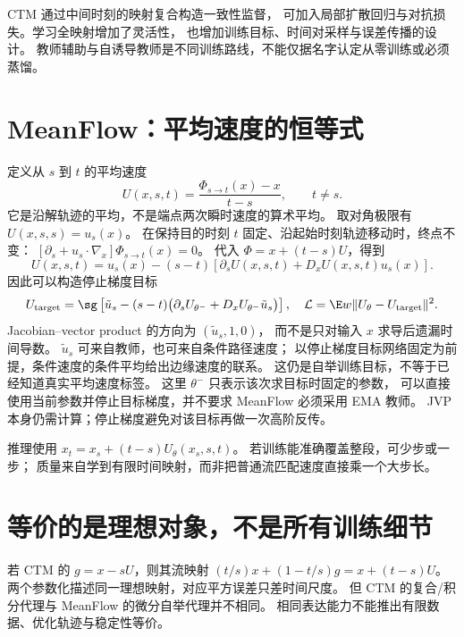CTM 通过中间时刻的映射复合构造一致性监督，
可加入局部扩散回归与对抗损失。学习全映射增加了灵活性，
也增加训练目标、时间对采样与误差传播的设计。
教师辅助与自诱导教师是不同训练路线，不能仅据名字认定从零训练或必须蒸馏。

\section{MeanFlow：平均速度的恒等式}

定义从 $s$ 到 $t$ 的平均速度
\begin{equation}\label{th:meanflow-definition}
U(x,s,t)=\frac{\Phi_{s\to t}(x)-x}{t-s},\qquad t\ne s.
\end{equation}
它是沿解轨迹的平均，不是端点两次瞬时速度的算术平均。
取对角极限有 $U(x,s,s)=u_s(x)$。
在保持目的时刻 $t$ 固定、沿起始时刻轨迹移动时，终点不变：
$[\partial_s+u_s\cdot\nabla_x]\Phi_{s\to t}(x)=0$。
代入 $\Phi=x+(t-s)U$，得到
\begin{equation}\label{th:meanflow-identity}
U(x,s,t)=u_s(x)-(s-t)
 \left[\partial_sU(x,s,t)+D_xU(x,s,t)u_s(x)\right].
\end{equation}
因此可以构造停止梯度目标
\[
U_{\rm target}=\sg\left[\tilde u_s-(s-t)
 \big(\partial_sU_{\theta^-}+D_xU_{\theta^-}\tilde u_s\big)\right],
\quad \mathcal L=\E w\|U_\theta-U_{\rm target}\|^2.
\]
Jacobian--vector product 的方向为 $(\tilde u_s,1,0)$，
而不是只对输入 $x$ 求导后遗漏时间导数。
$\tilde u_s$ 可来自教师，也可来自条件路径速度；
以停止梯度目标网络固定为前提，条件速度的条件平均给出边缘速度的联系。
这仍是自举训练目标，不等于已经知道真实平均速度标签。
这里 $\theta^-$ 只表示该次求目标时固定的参数，
可以直接使用当前参数并停止目标梯度，并不要求 MeanFlow 必须采用 EMA 教师。
JVP 本身仍需计算；停止梯度避免对该目标再做一次高阶反传。

推理使用 $x_t=x_s+(t-s)U_\theta(x_s,s,t)$。
若训练能准确覆盖整段，可少步或一步；
质量来自学到有限时间映射，而非把普通流匹配速度直接乘一个大步长。

\section{等价的是理想对象，不是所有训练细节}

若 CTM 的 $g=x-sU$，则其流映射
$(t/s)x+(1-t/s)g=x+(t-s)U$。
两个参数化描述同一理想映射，对应平方误差只差时间尺度。
但 CTM 的复合/积分代理与 MeanFlow 的微分自举代理并不相同。
相同表达能力不能推出有限数据、优化轨迹与稳定性等价。

